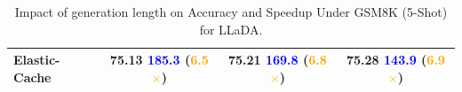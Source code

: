 \documentclass{article} %
\theoremstyle{definition}
\theoremstyle{remark}
\begin{document}
\begin{table}[t]
\begin{subtable}[t]{0.48\textwidth}
{\begin{tabular}{l|ccc}
    Elastic-Cache 
    & \makecell{ 75.13 \\ {\footnotesize \textcolor{blue}{185.3} (\textcolor{orange}{6.5\(\times\)})}} 
    & \makecell{ 75.21 \\ {\footnotesize \textcolor{blue}{169.8} (\textcolor{orange}{6.8\(\times\)})}} 
    & \makecell{ 75.28 \\ {\footnotesize \textcolor{blue}{143.9} (\textcolor{orange}{6.9\(\times\)})}} \\
    
\bottomrule
\end{tabular}
}
  \end{subtable}
  \hspace{0.1in}
  \begin{subtable}[t]{0.48\textwidth}
    \centering
\caption{Impact of generation length on Accuracy and Speedup Under GSM8K (5-Shot) for LLaDA.}
\label{tab:lla-instruct-ablation-gen-len}
  \end{subtable}
  \vspace{-0.1in}
\end{table}
\end{document}

